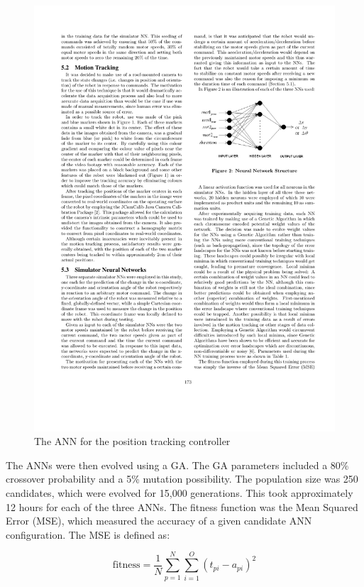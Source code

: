 \documentclass{sig-alternate}
\begin{document}
\begin{figure}%
\begin{center}
  \includegraphics[scale=1]{cr2}

\end{center}
\caption{The ANN for the position tracking controller}
\label{fig:ANN}
\end{figure}

  The ANNs were then evolved using a GA. The GA parameters included a 80\% crossover probability and a 5\% mutation possibility. The population size was 250 candidates, which were evolved for 15,000 generations. This took approximately 12 hours for each of the three ANNs. The fitness function was the Mean Squared Error (MSE), which measured the accuracy of a given candidate ANN configuration. The MSE is defined as:
  
  \[
  \textrm{fitness} = \frac{1}{N}\sum\limits_{p=1}^N\sum\limits_{i=1}^O (t_{pi} - a_{pi})^2
\] 
\end{document}
